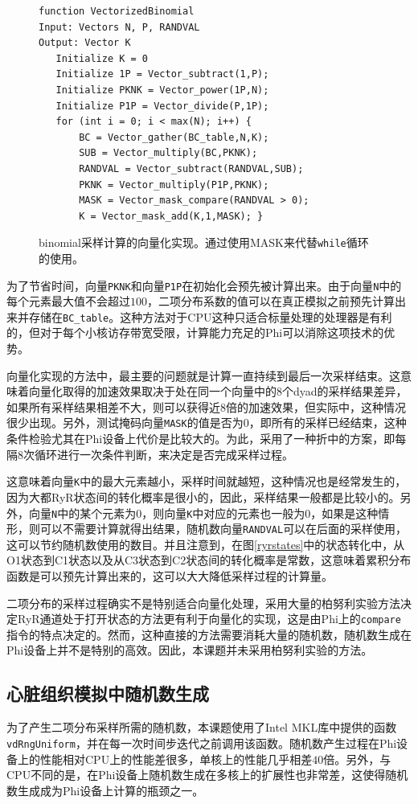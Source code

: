 \begin{figure}[hbt]
\small\begin{verbatim}
function VectorizedBinomial
Input: Vectors N, P, RANDVAL
Output: Vector K
   Initialize K = 0
   Initialize 1P = Vector_subtract(1,P);
   Initialize PKNK = Vector_power(1P,N);
   Initialize P1P = Vector_divide(P,1P);
   for (int i = 0; i < max(N); i++) {	
       BC = Vector_gather(BC_table,N,K);
       SUB = Vector_multiply(BC,PKNK);
       RANDVAL = Vector_subtract(RANDVAL,SUB);
       PKNK = Vector_multiply(P1P,PKNK);
       MASK = Vector_mask_compare(RANDVAL > 0);
       K = Vector_mask_add(K,1,MASK); }
\end{verbatim}
\caption{binomial采样计算的向量化实现。通过使用MASK来代替\texttt{while}循环的使用。}
\label{Vecbinom}
\end{figure}

为了节省时间，向量\texttt{PKNK}和向量\texttt{P1P}在初始化会预先被计算出来。由于向量{\tt N}中的每个元素最大值不会超过$100$，二项分布系数的值可以在真正模拟之前预先计算出来并存储在{\tt BC\_table}。这种方法对于CPU这种只适合标量处理的处理器是有利的，但对于每个小核访存带宽受限，计算能力充足的Phi可以消除这项技术的优势。

向量化实现的方法中，最主要的问题就是计算一直持续到最后一次采样结束。这意味着向量化取得的加速效果取决于处在同一个向量中的8个dyad的采样结果差异，如果所有采样结果相差不大，则可以获得近8倍的加速效果，但实际中，这种情况很少出现。另外，测试掩码向量\texttt{MASK}的值是否为0，即所有的采样已经结束，这种条件检验尤其在Phi设备上代价是比较大的。为此，采用了一种折中的方案，即每隔8次循环进行一次条件判断，来决定是否完成采样过程。

这意味着向量{\tt K}中的最大元素越小，采样时间就越短，这种情况也是经常发生的，因为大都RyR状态间的转化概率是很小的，因此，采样结果一般都是比较小的。另外，向量{\tt N}中的某个元素为0，则向量{\tt K}中对应的元素也一般为0，如果是这种情形，则可以不需要计算就得出结果，随机数向量{\tt RANDVAL}可以在后面的采样使用，这可以节约随机数使用的数目。并且注意到，在图\ref{ryrstates}中的状态转化中，从O1状态到C1状态以及从C3状态到C2状态间的转化概率是常数，这意味着累积分布函数是可以预先计算出来的，这可以大大降低采样过程的计算量。

二项分布的采样过程确实不是特别适合向量化处理，采用大量的柏努利实验方法决定RyR通道处于打开状态的方法更有利于向量化的实现，这是由Phi上的\texttt{compare}指令的特点决定的。然而，这种直接的方法需要消耗大量的随机数，随机数生成在Phi设备上并不是特别的高效。因此，本课题并未采用柏努利实验的方法。

\subsection{心脏组织模拟中随机数生成}
为了产生二项分布采样所需的随机数，本课题使用了Intel MKL库中提供的函数\texttt{vdRngUniform}，并在每一次时间步迭代之前调用该函数。随机数产生过程在Phi设备上的性能相对CPU上的性能差很多，单核上的性能几乎相差$40$倍。另外，与CPU不同的是，在Phi设备上随机数生成在多核上的扩展性也非常差，这使得随机数生成成为Phi设备上计算的瓶颈之一。

